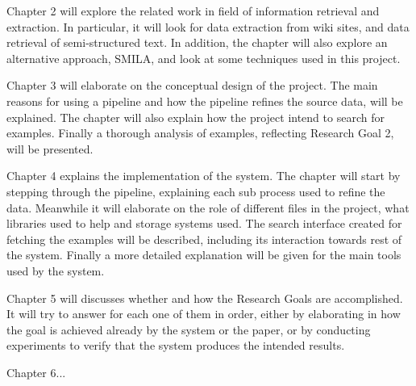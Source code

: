 Chapter 2 will explore the related work in field of information retrieval and extraction. In particular, it will look for data extraction from wiki sites, and data retrieval of semi-structured text. In addition, the chapter will also explore an alternative approach, SMILA, and look at some techniques used in this project.

Chapter 3 will elaborate on the conceptual design of the project. The main reasons for using a pipeline and how the pipeline refines the source data, will be explained. The chapter will also explain how the project intend to search for examples. Finally a thorough analysis of examples, reflecting Research Goal 2, will be presented.

Chapter 4 explains the implementation of the system. The chapter will start by stepping through the pipeline, explaining each sub process used to refine the data. Meanwhile it will elaborate on the role of different files in the project, what libraries used to help and storage systems used. The search interface created for fetching the examples will be described, including its interaction towards rest of the system. Finally a more detailed explanation will be given for the main tools used by the system.

Chapter 5 will discusses whether and how the Research Goals are accomplished. It will try to answer for each one of them in order, either by elaborating in how the goal is achieved already by the system or the paper, or by conducting experiments to verify that the system produces the intended results.

Chapter 6...


\cleardoublepage